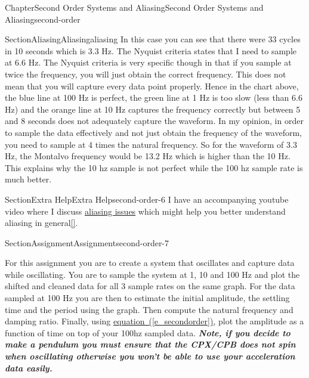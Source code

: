 \documentclass[oneside,10pt,]{book}
\newcommand{\xreffont}{\relax}
\newcommand{\linkhilite}[1]{\underline{#1}}
\newcommand{\alert}[1]{\textbf{\textit{#1}}}
\numberwithin{equation}{section}
\begin{document}
\begin{chapterptx}{Chapter}{Second Order Systems and Aliasing}{}{Second Order Systems and Aliasing}{}{}{second-order}
\begin{sectionptx}{Section}{Aliasing}{}{Aliasing}{}{}{aliasing}
In this case you can see that there were 33 cycles in 10 seconds which is 3.3 Hz. The Nyquist criteria states that I need to sample at 6.6 Hz. The Nyquist criteria is very specific though in that if you sample at twice the frequency, you will just obtain the correct frequency. This does not mean that you will capture every data point properly. Hence in the chart above, the blue line at 100 Hz is perfect, the green line at 1 Hz is too slow (less than 6.6 Hz) and the orange line at 10 Hz captures the frequency correctly but between 5 and 8 seconds does not adequately capture the waveform. In my opinion, in order to sample the data effectively and not just obtain the frequency of the waveform, you need to sample at 4 times the natural frequency. So for the waveform of 3.3 Hz, the Montalvo frequency would be 13.2 Hz which is higher than the 10 Hz. This explains why the 10 hz sample is not perfect while the 100 hz sample rate is much better.%
\end{sectionptx}
%
%
\typeout{************************************************}
\typeout{************************************************}
%
\begin{sectionptx}{Section}{Extra Help}{}{Extra Help}{}{}{second-order-6}
I have an accompanying youtube video where I discuss \href{https://youtu.be/8F_8st_8MmA}{\linkhilite{aliasing issues}} which might help you better understand aliasing in general\hyperlink{youtube}{\linkhilite{[{\xreffont 50}]}}.%
\end{sectionptx}
%
%
\typeout{************************************************}
\typeout{************************************************}
%
\begin{sectionptx}{Section}{Assignment}{}{Assignment}{}{}{second-order-7}
\begin{introduction}{}%
For this assignment you are to create a system that oscillates and capture data while oscillating. You are to sample the system at 1, 10 and 100 Hz and plot the shifted and cleaned data for all 3 sample rates on the same graph. For the data sampled at 100 Hz you are then to estimate the initial amplitude, the settling time and the period using the graph. Then compute the natural frequency and damping ratio. Finally, using \hyperref[e_secondorder]{\linkhilite{equation~({\xreffont\ref{e_secondorder}})}}, plot the amplitude as a function of time on top of your 100hz sampled data. \alert{Note, if you decide to make a pendulum you must ensure that the CPX\slash{}CPB does not spin when oscillating otherwise you won't be able to use your acceleration data easily.}%

\end{introduction}
\end{sectionptx}
\end{chapterptx}
\end{document}
